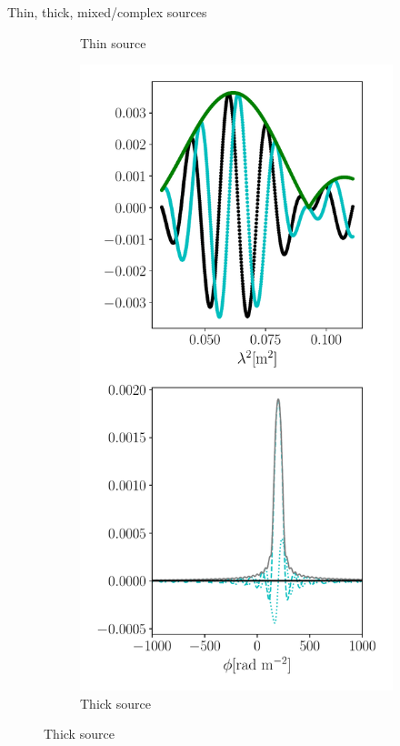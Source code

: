 \documentclass[xetex,aspectratio=169]{beamer}
\begin{document}
\begin{frame}{Thin, thick, mixed/complex sources}
\begin{figure}
\begin{subfigure}{0.2\textwidth}
			\caption{Thin source}
		\end{subfigure}
		\begin{subfigure}{0.2\textwidth}
			\includegraphics[width=\textwidth]{figures/sources/thick_source.pdf}
			\caption{Thick source}

\end{subfigure}
\end{figure}
\end{frame}
\end{document}
